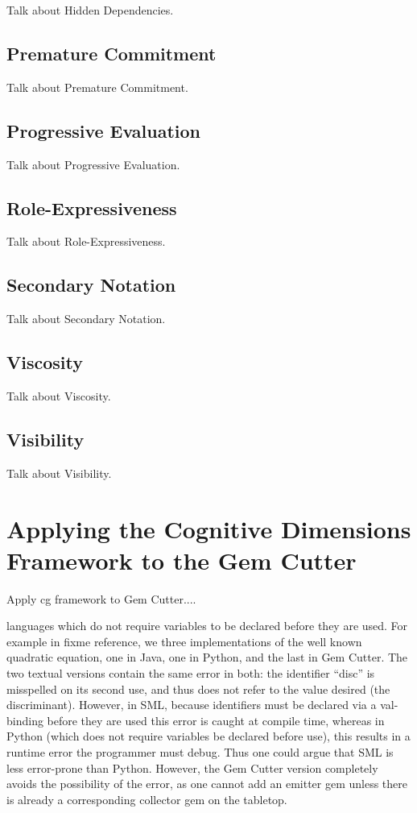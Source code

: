 Talk about Hidden Dependencies.

\subsection{Premature Commitment}
\label{prematurecommitmentoutline}

Talk about Premature Commitment.

\subsection{Progressive Evaluation}
\label{progressiveevaluationoutline}

Talk about Progressive Evaluation.

\subsection{Role-Expressiveness}
\label{roleexpressivenessoutline}

Talk about Role-Expressiveness.

\subsection{Secondary Notation}
\label{secondarynotationoutline}

Talk about Secondary Notation.

\subsection{Viscosity}
\label{viscosityoutline}

Talk about Viscosity.

\subsection{Visibility}
\label{visibilityoutline}

Talk about Visibility.

\section{Applying the Cognitive Dimensions Framework to the Gem Cutter}

Apply cg framework to Gem Cutter....

languages which do not require variables to be declared before they are used.  For example in fixme reference, we three implementations of the well known quadratic equation, one in Java, one in Python, and the last in Gem Cutter.  The two textual versions contain the same error in both: the identifier ``disc'' is misspelled on its second use, and thus does not refer to the value desired (the discriminant).  However, in SML, because identifiers must be declared via a val-binding before they are used this error is caught at compile time, whereas in Python (which does not require variables be declared before use), this results in a runtime error the programmer must debug.  Thus one could argue that SML is less error-prone than Python.  However, the Gem Cutter version completely avoids the possibility of the error, as one cannot add an emitter gem unless there is already a corresponding collector gem on the tabletop.


